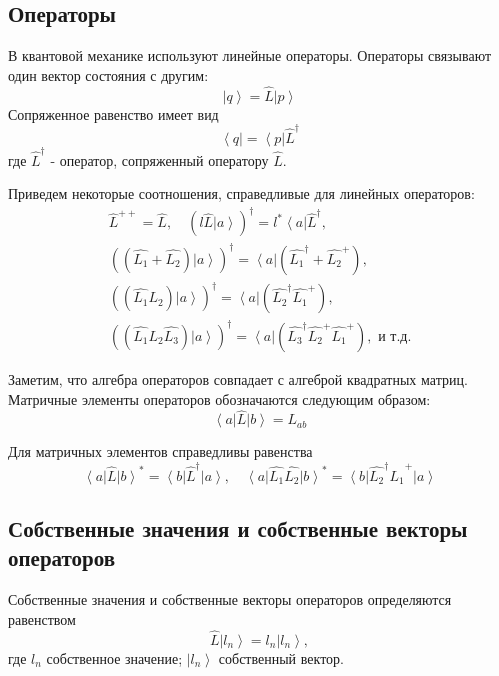 \subsection{Операторы}
В квантовой механике используют линейные операторы. Операторы
связывают один вектор состояния с другим: 
\begin{equation}
\left| q \right> = \hat{L}\left| p \right>
\label{eqAddDirac_operator_property1}
\end{equation}
Сопряженное равенство имеет вид
\begin{equation}
\left< q \right| = \left< p \right|  \hat{L}^{\dag}
\label{eqAddDirac_operator_property2}
\end{equation}
где $\hat{L}^{\dag}$ -  оператор, сопряженный оператору $\hat{L}$.

Приведем некоторые соотношения, справедливые для линейных 
операторов:
\begin{eqnarray}
\hat{L}^{++} = \hat{L}, \quad
\left(l \hat{L} \left| a \right> \right)^{\dag} = 
l^{*} \left< a \right| \hat{L}^{\dag}, 
\nonumber \\
\left(\left(\hat{L_1} + \hat{L_2} \right) \left| a \right> \right)^{\dag} = 
\left< a \right| \left(\hat{L_1}^{\dag} + \hat{L_2}^{+} \right), 
\nonumber \\
\left(\left(\hat{L_1} \hat{L_2} \right) \left| a \right> \right)^{\dag} = 
\left< a \right| \left(\hat{L_2}^{\dag} \hat{L_1}^{+} \right),
\nonumber \\
\left(\left(\hat{L_1} \hat{L_2} \hat{L_3}\right) \left| a \right> \right)^{\dag} = 
\left< a \right| \left(\hat{L_3}^{\dag} \hat{L_2}^{+} \hat{L_1}^{+} \right), 
\mbox{ и т.д.}
\label{eqAddDirac_propert}
\end{eqnarray}

Заметим, что алгебра операторов совпадает с алгеброй квадратных
матриц. Матричные элементы операторов обозначаются следующим образом: 
\begin{equation}
\left<a\right|\hat{L}\left|b\right> = L_{ab}
\end{equation}

Для матричных элементов справедливы равенства
\begin{equation}
\left<a\right|\hat{L}\left|b\right>^{*} = 
\left<b\right|\hat{L}^{\dag}\left|a\right>, \quad
\left<a\right|\hat{L_1}\hat{L_2}\left|b\right>^{*} = 
\left<b\right|\hat{L_2}^{\dag}\hat{L_1}^{+}\left|a\right>
\end{equation}


\subsection{Собственные  значения  и  собственные  векторы  операторов} 
Собственные значения и собственные векторы операторов определяются равенством
\begin{equation}
\hat{L} \left|l_n\right> = l_n \left|l_n\right>,
\end{equation}
где $l_n$ собственное значение; $\left|l_n\right>$ собственный вектор.

